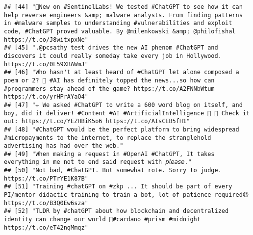 \documentclass[
]{article}
\begin{document}
\begin{verbatim}
## [44] "🤖New on #SentinelLabs! We tested #ChatGPT to see how it can help reverse engineers &amp; malware analysts. From finding patterns in #malware samples to understanding #vulnerabilities and exploit code, #ChatGPT proved valuable. By @milenkowski &amp; @philofishal https://t.co/J8witxpxNe"                
## [45] ".@pcsathy test drives the new AI phenom #ChatGPT and discovers it could really someday take every job in Hollywood. https://t.co/0L59XBAWmJ"                                                                                                                                                                   
## [46] "Who hasn't at least heard of #ChatGPT let alone composed a poem or 2? 🙋 #AI has definitely topped the news...so how can #programmers stay ahead of the game? https://t.co/A2FNNbWtum https://t.co/yrHPrAYaO4"                                                                                                 
## [47] "✏️ We asked #ChatGPT to write a 600 word blog on itself, and boy, did it deliver! #Content #AI #ArtificialIntelligence 📃 🤖 Check it out: https://t.co/YEZHBiK5o6 https://t.co/AIsCEB5fH1"                                                                                                                     
## [48] "#ChatGPT would be the perfect platform to bring widespread #micropayments to the internet, to replace the stranglehold advertising has had over the web."                                                                                                                                                      
## [49] "When making a request in #OpenAI #ChatGPT, It takes everything in me not to end said request with 𝘱𝘭𝘦𝘢𝘴𝘦."                                                                                                                                                                                                     
## [50] "Not bad, #ChatGPT. But somewhat rote. Sorry to judge. https://t.co/PTrYE1K87B"                                                                                                                                                                                                                                 
## [51] "Training #chatGPT on #zkp ... It should be part of every PI/mentor didactic training to train a bot, lot of patience required😆 https://t.co/B3Q0Ew6sza"                                                                                                                                                       
## [52] "TLDR by #chatGPT about how blockchain and decentralized identity can change our world 🖖#cardano #prism #midnight https://t.co/eT42nqMmqz"                                                                                                                                                                     

\end{verbatim}
\end{document}
